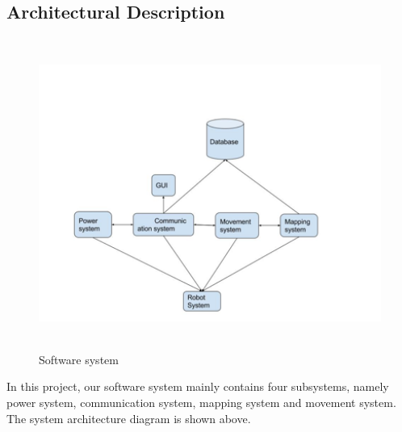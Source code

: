 \documentclass[11pt, a4paper]{article}
\begin{document}
\subsection{Architectural Description}
\begin{figure}[H]
\centering
\includegraphics[height=4in]{SS}
\caption[Software system]{Software system}
\end{figure}

In this project, our software system mainly contains four subsystems, namely power system, communication system, mapping system and movement system. The system architecture diagram is shown above.
\end{document}
